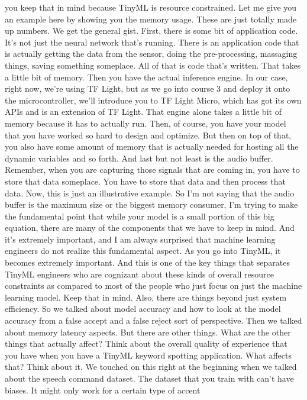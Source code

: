 you keep that in mind because TinyML is resource constrained.
Let me give you an example here by showing you the memory usage.
These are just totally made up numbers.
We get the general gist.
First, there is some bit of application code.
It's not just the neural network that's running.
There is an application code that is actually
getting the data from the sensor, doing the pre-processing,
massaging things, saving something someplace.
All of that is code that's written.
That takes a little bit of memory.
Then you have the actual inference engine.
In our case, right now, we're using TF Light, but as we go into course 3
and deploy it onto the microcontroller, we'll
introduce you to TF Light Micro, which has got its own APIs
and is an extension of TF Light.
That engine alone takes a little bit of memory because it has to actually run.
Then, of course, you have your model that you have
worked so hard to design and optimize.
But then on top of that, you also have some amount of memory
that is actually needed for hosting all the dynamic variables and so forth.
And last but not least is the audio buffer.
Remember, when you are capturing those signals that are coming in,
you have to store that data someplace.
You have to store that data and then process that data.
Now, this is just an illustrative example.
So I'm not saying that the audio buffer is the maximum size or the biggest
memory consumer, I'm trying to make the fundamental point
that while your model is a small portion of this big equation,
there are many of the components that we have to keep in mind.
And it's extremely important, and I am always
surprised that machine learning engineers do not
realize this fundamental aspect.
As you go into TinyML, it becomes extremely important.
And this is one of the key things that separates TinyML engineers who
are cognizant about these kinds of overall resource constraints
as compared to most of the people who just focus on just the machine learning
model.
Keep that in mind.
Also, there are things beyond just system efficiency.
So we talked about model accuracy and how
to look at the model accuracy from a false accept
and a false reject sort of perspective.
Then we talked about memory latency aspects.
But there are other things.
What are the other things that actually affect?
Think about the overall quality of experience
that you have when you have a TinyML keyword spotting application.
What affects that?
Think about it.
We touched on this right at the beginning
when we talked about the speech command dataset.
The dataset that you train with can't have biases.
It might only work for a certain type of accent
